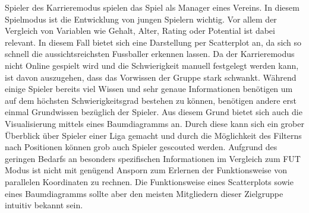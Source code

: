\documentclass[usegeometry=true]{scrartcl}
\begin{document}
Spieler des Karrieremodus spielen das Spiel als Manager eines Vereins. In diesem Spielmodus ist die Entwicklung von jungen Spielern wichtig. Vor allem der Vergleich von Variablen wie Gehalt, Alter, Rating oder Potential ist dabei relevant. In diesem Fall bietet sich eine Darstellung per Scatterplot an, da sich so schnell die aussichtsreichsten Fussballer erkennen lassen. Da der Karrieremodus nicht Online gespielt wird und die Schwierigkeit manuell festgelegt werden kann, ist davon auszugehen, dass das Vorwissen der Gruppe stark schwankt. Während einige Spieler bereits viel Wissen und sehr genaue Informationen benötigen um auf dem höchsten Schwierigkeitsgrad bestehen zu können, benötigen andere erst einmal Grundwissen bezüglich der Spieler. Aus diesem Grund bietet sich auch die Visualisierung mittels eines Baumdiagramms an. Durch diese kann sich ein grober Überblick über Spieler einer Liga gemacht und durch die Möglichkeit des Filterns nach Positionen können grob auch Spieler gescouted werden. Aufgrund des geringen Bedarfs an besonders spezifischen Informationen im Vergleich zum FUT Modus ist nicht mit genügend Ansporn zum Erlernen der Funktionsweise von parallelen Koordinaten zu rechnen. Die Funktionsweise eines Scatterplots sowie eines Baumdiagramms sollte aber den meisten Mitgliedern dieser Zielgruppe intuitiv bekannt sein.
\end{document}
